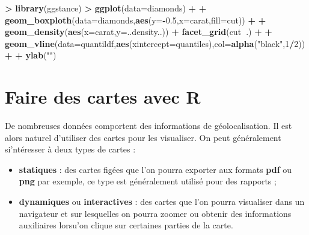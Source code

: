 \documentclass[]{book}
\newenvironment{Shaded}{\begin{snugshade}}{\end{snugshade}}
\newcommand{\DataTypeTok}[1]{\textcolor[rgb]{0.13,0.29,0.53}{#1}}
\newcommand{\DecValTok}[1]{\textcolor[rgb]{0.00,0.00,0.81}{#1}}
\newcommand{\FloatTok}[1]{\textcolor[rgb]{0.00,0.00,0.81}{#1}}
\newcommand{\KeywordTok}[1]{\textcolor[rgb]{0.13,0.29,0.53}{\textbf{#1}}}
\newcommand{\NormalTok}[1]{#1}
\newcommand{\OperatorTok}[1]{\textcolor[rgb]{0.81,0.36,0.00}{\textbf{#1}}}
\newcommand{\OtherTok}[1]{\textcolor[rgb]{0.56,0.35,0.01}{#1}}
\newcommand{\StringTok}[1]{\textcolor[rgb]{0.31,0.60,0.02}{#1}}
\providecommand{\tightlist}{%
  \setlength{\itemsep}{0pt}\setlength{\parskip}{0pt}}
\theoremstyle{definition}
\theoremstyle{definition}
\theoremstyle{definition}
\theoremstyle{remark}
\begin{document}
\begin{Shaded}
\begin{Highlighting}[]
\OperatorTok{>}\StringTok{ }\KeywordTok{library}\NormalTok{(ggstance)}
\OperatorTok{>}\StringTok{ }\KeywordTok{ggplot}\NormalTok{(}\DataTypeTok{data=}\NormalTok{diamonds) }\OperatorTok{+}
\OperatorTok{+}\StringTok{   }\KeywordTok{geom_boxploth}\NormalTok{(}\DataTypeTok{data=}\NormalTok{diamonds,}\KeywordTok{aes}\NormalTok{(}\DataTypeTok{y=}\OperatorTok{-}\FloatTok{0.5}\NormalTok{,}\DataTypeTok{x=}\NormalTok{carat,}\DataTypeTok{fill=}\NormalTok{cut)) }\OperatorTok{+}
\OperatorTok{+}\StringTok{   }\KeywordTok{geom_density}\NormalTok{(}\KeywordTok{aes}\NormalTok{(}\DataTypeTok{x=}\NormalTok{carat,}\DataTypeTok{y=}\NormalTok{..density..)) }\OperatorTok{+}\StringTok{  }\KeywordTok{facet_grid}\NormalTok{(cut}\OperatorTok{~}\NormalTok{.) }\OperatorTok{+}
\OperatorTok{+}\StringTok{   }\KeywordTok{geom_vline}\NormalTok{(}\DataTypeTok{data=}\NormalTok{quantildf,}\KeywordTok{aes}\NormalTok{(}\DataTypeTok{xintercept=}\NormalTok{quantiles),}\DataTypeTok{col=}\KeywordTok{alpha}\NormalTok{(}\StringTok{"black"}\NormalTok{,}\DecValTok{1}\OperatorTok{/}\DecValTok{2}\NormalTok{))}\OperatorTok{+}
\OperatorTok{+}\StringTok{   }\KeywordTok{ylab}\NormalTok{(}\StringTok{""}\NormalTok{)}
\end{Highlighting}
\end{Shaded}

\begin{Shaded}
\end{Shaded}

\hypertarget{faire-des-cartes-avec-r}{%
\chapter{Faire des cartes avec R}\label{faire-des-cartes-avec-r}}

De nombreuses données comportent des informations de géolocalisation. Il est alors naturel d'utiliser des cartes pour les visualiser. On peut généralement si'ntéresser à deux types de cartes :

\begin{itemize}
\tightlist
\item
  \textbf{statiques} : des cartes figées que l'on pourra exporter aux formats \textbf{pdf} ou \textbf{png} par exemple, ce type est généralement utilisé pour des rapports ;
\item
  \textbf{dynamiques} ou \textbf{interactives} : des cartes que l'on pourra visualiser dans un navigateur et sur lesquelles on pourra zoomer ou obtenir des informations auxiliaires lorsu'on clique sur certaines parties de la carte.
\end{itemize}
\end{document}
